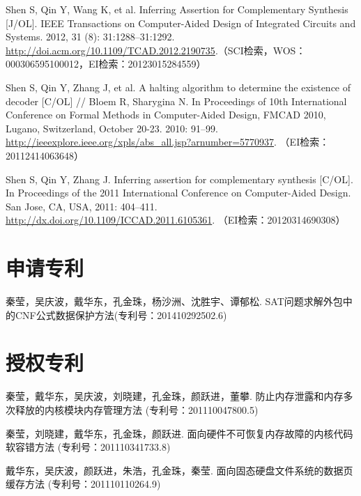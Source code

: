 \begin{resume}
\begin{enumerate}[{[}1{]}]
  \item Shen S, Qin Y, Wang K, et al. Inferring Assertion for Complementary Synthesis
[J/OL]. IEEE Transactions on Computer-Aided Design of Integrated Circuits
and Systems. 2012, 31 (8): 31:1288–31:1292. \url{http://doi.acm.org/10.1109/TCAD.2012.2190735}.（SCI检索，WOS：000306595100012，EI检索：20123015284559）

\item  Shen S, Qin Y, Zhang J, et al. A halting algorithm to determine the existence of
decoder [C/OL] // Bloem R, Sharygina N. In Proceedings of 10th International
Conference on Formal Methods in Computer-Aided Design, FMCAD 2010,
Lugano, Switzerland, October 20-23. 2010: 91–99. \url{http://ieeexplore.ieee.org/xpls/abs_all.jsp?arnumber=5770937}. （EI检索：20112414063648）

  \item Shen S, Qin Y, Zhang J. Inferring assertion for complementary synthesis [C/OL]. In
Proceedings of the 2011 International Conference on Computer-Aided Design. San
Jose, CA, USA, 2011: 404–411. \url{http://dx.doi.org/10.1109/ICCAD.2011.6105361}. （EI检索：20120314690308）


  \end{enumerate}

  \section*{申请专利} %
  \begin{enumerate}[{[}1{]}]
  \addtolength{\itemsep}{-.36\baselineskip}%
  \item 秦莹，吴庆波，戴华东，孔金珠，杨沙洲、沈胜宇、谭郁松. SAT问题求解外包中的CNF公式数据保护方法(专利号：201410292502.6)
  \end{enumerate}
  \section*{授权专利} %
  \begin{enumerate}[{[}1{]}]
  \addtolength{\itemsep}{-.36\baselineskip}%
  \item 秦莹，戴华东，吴庆波，刘晓建，孔金珠，颜跃进，董攀. 防止内存泄露和内存多次释放的内核模块内存管理方法 (专利号：201110047800.5)
  \item 秦莹，刘晓建，戴华东，孔金珠，颜跃进. 面向硬件不可恢复内存故障的内核代码软容错方法 (专利号：201110341733.8)
  \item 戴华东，吴庆波，颜跃进，朱浩，孔金珠，秦莹. 面向固态硬盘文件系统的数据页缓存方法 (专利号：201110110264.9)
  \end{enumerate}



\end{resume}
